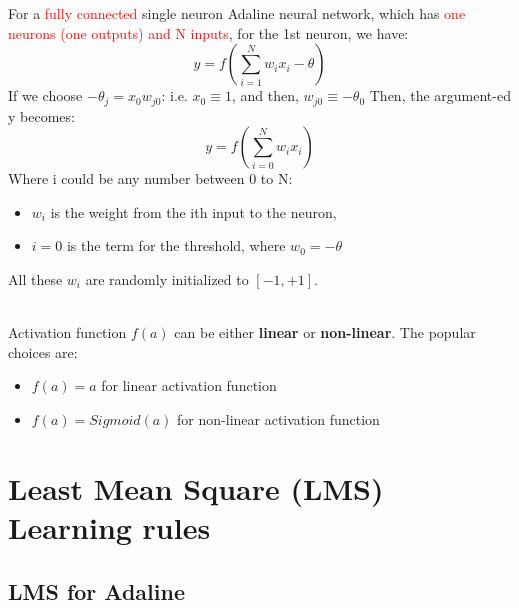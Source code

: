 For a \textcolor{red}{fully connected} single neuron Adaline neural network, which has \textcolor{red}{one neurons (one outputs) and N inputs},
for the 1st neuron, we have:
\[{y} = f(\sum\limits_{i = 1}^N {{w_{i}}} {x_i} - {\theta})\]
If we choose $ - {\theta _j} = {x_0} {w_{j0}}$:  i.e. $x_0 \equiv 1$, and then, $w_{j0}\equiv-\theta_0$
Then, the argument-ed y becomes:
\[{y} = f(\sum\limits_{i = 0}^N {{w_{i}}} {x_i})\]
Where i could be any number between 0 to N:
\begin{itemize}
    \item $w_i$ is the weight from the ith input to the neuron,
    \item $i = 0$ is the term for the threshold, where $w_0 = - \theta$
\end{itemize}
All these $w_i$ are randomly initialized to $[-1,+1]$.


\begin{center}
\end{center}
\\
Activation function $f(a)$ can be either \textbf{linear} or \textbf{non-linear}. The popular choices are:
\begin{itemize}
    \item $f(a)=a$ for linear activation function
    \item $f(a)=Sigmoid(a)$ for non-linear activation function
\end{itemize}
\noindent{\color{red} \rule{\linewidth}{0.5mm}}
\section{Least Mean Square (LMS) Learning rules}
\subsection{LMS for Adaline}
 
